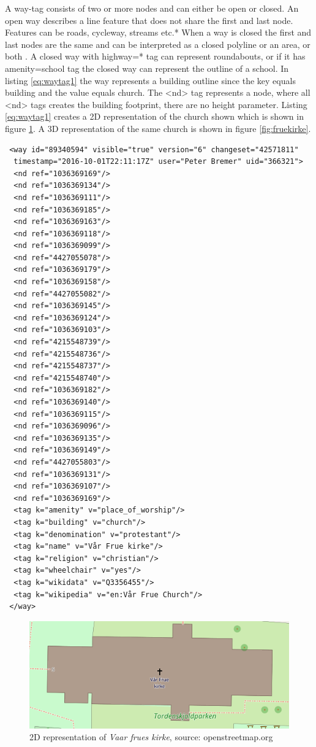 A way-tag consists of two or more nodes and can either be open or closed. An open way describes a line feature that does not share the first and last node. Features can be roads, cycleway, streams etc.* %
When a way is closed the first and last nodes are the same and can be interpreted as a closed polyline or an area, or both \cite{OpenStreetMapd}. A closed way with highway=* tag can represent roundabouts, or if it has amenity=school tag the closed way can represent the outline of a school. In listing \ref{eq:waytag1} the way represents a building outline since the key equals building and the value equals church. The <nd> tag represents a node, where all <nd> tags creates the building footprint, there are no height parameter. Listing \ref{eq:waytag1} creates a 2D representation of the church shown which is shown in figure \ref{fig:fruekirke2D}. A 3D representation of the same church is shown in figure \ref{fig:fruekirke}.

\begin{lstlisting}
 <way id="89340594" visible="true" version="6" changeset="42571811" 
  timestamp="2016-10-01T22:11:17Z" user="Peter Bremer" uid="366321">
  <nd ref="1036369169"/>
  <nd ref="1036369134"/>
  <nd ref="1036369111"/>
  <nd ref="1036369185"/>
  <nd ref="1036369163"/>
  <nd ref="1036369118"/>
  <nd ref="1036369099"/>
  <nd ref="4427055078"/>
  <nd ref="1036369179"/>
  <nd ref="1036369158"/>
  <nd ref="4427055082"/>
  <nd ref="1036369145"/>
  <nd ref="1036369124"/>
  <nd ref="1036369103"/>
  <nd ref="4215548739"/>
  <nd ref="4215548736"/>
  <nd ref="4215548737"/>
  <nd ref="4215548740"/>
  <nd ref="1036369182"/>
  <nd ref="1036369140"/>
  <nd ref="1036369115"/>
  <nd ref="1036369096"/>
  <nd ref="1036369135"/>
  <nd ref="1036369149"/>
  <nd ref="4427055803"/>
  <nd ref="1036369131"/>
  <nd ref="1036369107"/>
  <nd ref="1036369169"/>
  <tag k="amenity" v="place_of_worship"/>
  <tag k="building" v="church"/>
  <tag k="denomination" v="protestant"/>
  <tag k="name" v="Vår Frue kirke"/>
  <tag k="religion" v="christian"/>
  <tag k="wheelchair" v="yes"/>
  <tag k="wikidata" v="Q3356455"/>
  <tag k="wikipedia" v="en:Vår Frue Church"/>
 </way>
\end{lstlisting}

\begin{figure}[H]
    \centering
    \includegraphics[scale=0.5]{figures/FixedByMe/fruekirke2D.png}
    \caption{2D representation of \textit{Vaar frues kirke}, source: openstreetmap.org}
    \label{fig:fruekirke2D}
\end{figure}

